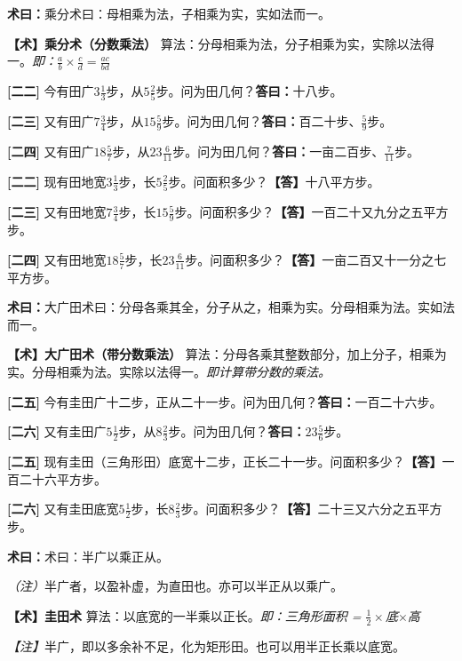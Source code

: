 \documentclass[10pt,a4paper]{article}
\newlength{\lw}
\newlength{\rw}
\newcommand{\bilingc}[2]{%
  \par\vspace{0.1em}%
  \noindent\begin{minipage}[t]{\lw}
  {\small #1}
  \end{minipage}%
  \hfill%
  \begin{minipage}[t]{\rw}
  {\small #2}
  \end{minipage}%
  \vspace{0.1em}%
}
\newcommand{\da}{\textbf{\textcolor{answercolor}{答曰：}}}
\newcommand{\daB}{\textbf{\textcolor{answercolor}{【答】}}}
\newcommand{\shu}{\textbf{\textcolor{methodcolor}{术曰：}}}
\newcommand{\shuB}{\textbf{\textcolor{methodcolor}{【术】}}}
\newcommand{\zhu}{\textcolor{commentarycolor}{\small\textit{（注）}}}
\newcommand{\zhuB}{\textcolor{commentarycolor}{\small\textit{【注】}}}
\newcommand{\pn}[1]{\textbf{[#1]}}
\newcommand{\sk}{\vspace{0.1em}}
\begin{document}
\sk

\bilingc{
\shu 乘分术曰：母相乘为法，子相乘为实，实如法而一。
}{
\shuB \textbf{乘分术（分数乘法）} 算法：分母相乘为法，分子相乘为实，实除以法得一。\textit{即：$\frac{a}{b}\times\frac{c}{d}=\frac{ac}{bd}$}
}

\vspace{0.3em}

\bilingc{
\pn{二二} 今有田广$3\frac13$步，从$5\frac25$步。问为田几何？\quad\da 十八步。

\pn{二三} 又有田广$7\frac34$步，从$15\frac59$步。问为田几何？\quad\da 百二十步、$\frac59$步。

\pn{二四} 又有田广$18\frac57$步，从$23\frac6{11}$步。问为田几何？\quad\da 一亩二百步、$\frac7{11}$步。
}{
\pn{二二} 现有田地宽$3\frac{1}{3}$步，长$5\frac{2}{5}$步。问面积多少？\quad\daB 十八平方步。

\pn{二三} 又有田地宽$7\frac{3}{4}$步，长$15\frac{5}{9}$步。问面积多少？\quad\daB 一百二十又九分之五平方步。

\pn{二四} 又有田地宽$18\frac{5}{7}$步，长$23\frac{6}{11}$步。问面积多少？\quad\daB 一亩二百又十一分之七平方步。
}

\sk

\bilingc{
\shu 大广田术曰：分母各乘其全，分子从之，相乘为实。分母相乘为法。实如法而一。
}{
\shuB \textbf{大广田术（带分数乘法）} 算法：分母各乘其整数部分，加上分子，相乘为实。分母相乘为法。实除以法得一。\textit{即计算带分数的乘法。}
}

\vspace{0.3em}

\bilingc{
\pn{二五} 今有圭田广十二步，正从二十一步。问为田几何？\quad\da 一百二十六步。

\pn{二六} 又有圭田广$5\frac12$步，从$8\frac23$步。问为田几何？\quad\da $23\frac56$步。
}{
\pn{二五} 现有圭田（三角形田）底宽十二步，正长二十一步。问面积多少？\quad\daB 一百二十六平方步。

\pn{二六} 又有圭田底宽$5\frac{1}{2}$步，长$8\frac{2}{3}$步。问面积多少？\quad\daB 二十三又六分之五平方步。
}

\sk

\bilingc{
\shu 术曰：半广以乘正从。

\zhu 半广者，以盈补虚，为直田也。亦可以半正从以乘广。
}{
\shuB \textbf{圭田术} 算法：以底宽的一半乘以正长。\textit{即：三角形面积 = $\frac12\times$底$\times$高}

\zhuB 半广，即以多余补不足，化为矩形田。也可以用半正长乘以底宽。
}
\end{document}
